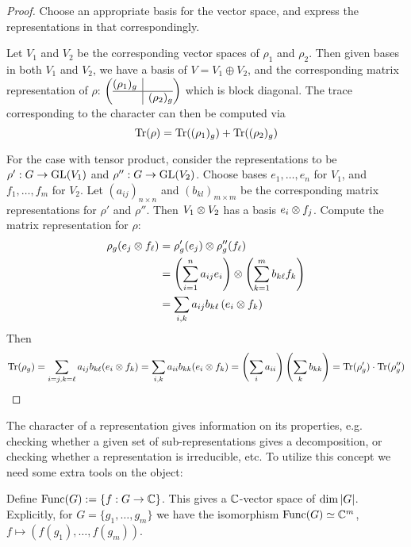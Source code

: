 \documentclass{article}
\begin{document}
\begin{proof}
    Choose an appropriate basis for the vector space, and express the representations in that correspondingly.

    Let $V_1$ and $V_2$ be the corresponding vector spaces of $\rho_1$ and $\rho_2$. Then given bases in both $V_1$ and $V_2$, we have a basis of $V = V_1 \oplus V_2$, and the corresponding matrix representation of $\rho$:
    $
    \left(\begin{array}{@{}c|c@{}}
        (\rho_1)_g & \\ \hline
        & (\rho_2)_g \\
      \end{array}\right)
    $
    which is block diagonal. The trace corresponding to the character can then be computed via
    \[
        \operatorname{Tr}(\rho) = \operatorname{Tr}((\rho_1)_g) + \operatorname{Tr}((\rho_2)_g)
    \]

    For the case with tensor product, consider the representations to be $\rho': G \to \mathrm{GL}(V_1)$ and $\rho'': G \to \mathrm{GL}(V_2)$. Choose bases $e_1, \dots, e_n$ for $V_1$, and $f_1, \dots, f_m$ for $V_2$. Let $(a_{ij})_{n \times n}$ and $(b_{kl})_{m \times m}$ be the corresponding matrix representations for $\rho'$ and $\rho''$. Then $V_1 \otimes V_2$ has a basis $e_i \otimes f_j$. Compute the matrix representation for $\rho$:
    \begin{align*}
        \rho_g(e_j \otimes f_{\ell})
        & = \rho_g'(e_j) \otimes \rho_g'' (f_{\ell}) \\
        & = \left( \sum_{i = 1}^n a_{ij} e_i \right) \otimes \left( \sum_{k = 1}^m b_{k\ell} f_k \right) \\
        & = \sum_{i, k} a_{ij} b_{k\ell} \left( e_i \otimes f_k \right)
    \end{align*}
    Then
    \[
        \operatorname{Tr}(\rho_g) = \sum_{i = j, k = \ell} a_{ij} b_{k\ell} (e_i \otimes f_k) = \sum_{i, k} a_{ii} b_{kk} (e_i \otimes f_k) = \left( \sum_{i} a_{ii} \right) \left( \sum_{k} b_{kk} \right) = \operatorname{Tr}(\rho_g')\cdot\operatorname{Tr}(\rho_g'')
    \]
\end{proof}

\textstart
The character of a representation gives information on its properties, e.g. checking whether a given set of sub-representations gives a decomposition, or checking whether a representation is irreducible, etc. To utilize this concept we need some extra tools on the object:

\begin{notation}
    Define $\mathrm{Func}(G) := \{ f: G \to \mathbb{C} \}$. This gives a $\mathbb{C}$-vector space of $\dim \left|G\right|$. Explicitly, for $G = \{g_1, \dots, g_m\}$ we have the isomorphism $\mathrm{Func}(G) \simeq \mathbb{C}^m$, $f \mapsto (f(g_1), \dots, f(g_m))$.
\end{notation}
\end{document}

